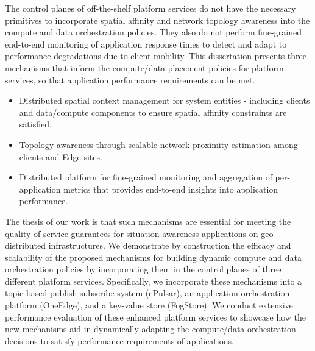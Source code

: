 \begin{summary}
The control planes of off-the-shelf platform services do not have the necessary primitives to incorporate spatial affinity and network topology awareness into the compute and data orchestration policies. They also do not perform fine-grained end-to-end monitoring of application response times to detect and adapt to performance degradations due to client mobility. This dissertation presents three mechanisms that inform the compute/data placement policies for platform services, so that application performance requirements can be met.
\begin{itemize}
\item Distributed spatial context management for system entities - including clients and data/compute components to ensure spatial affinity constraints are satisfied.
\item Topology awareness through scalable network proximity estimation among clients and Edge sites.
\item Distributed platform for fine-grained monitoring and aggregation of per-application metrics that provides end-to-end insights into application performance.
\end{itemize}
The thesis of our work is that such mechanisms are essential for meeting the quality of service guarantees for situation-awareness applications on geo-distributed infrastructures. We demonstrate by construction the efficacy and scalability of the proposed mechanisms for building dynamic compute and data orchestration policies by incorporating them in the control planes of three different platform services. Specifically, we incorporate these mechanisms into a topic-based publish-subscribe system (ePulsar), an application orchestration platform (OneEdge), and a key-value store (FogStore). We conduct extensive performance evaluation of these enhanced platform services to showcase how the new mechanisms aid in dynamically adapting the compute/data orchestration decisions to satisfy performance requirements of applications.
\end{summary}